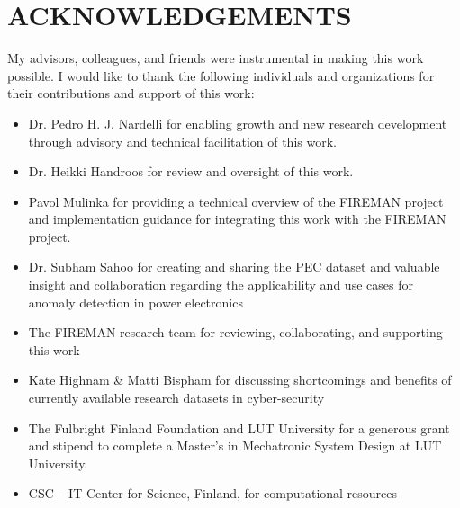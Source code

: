 \section*{\MakeUppercase{Acknowledgements}}
\thispagestyle{empty}
{}%

My advisors, colleagues, and friends were instrumental in making this work possible. I would like to thank the following individuals and organizations for their contributions and support of this work:

\begin{itemize}
    \item Dr. Pedro H. J. Nardelli for enabling growth and new research development through advisory and technical facilitation of this work.
    \item Dr. Heikki Handroos for review and oversight of this work.
    \item Pavol Mulinka for providing a technical overview of the FIREMAN project and implementation guidance for integrating this work with the FIREMAN project.
    \item Dr. Subham Sahoo for creating and sharing the PEC dataset and valuable insight and collaboration regarding the applicability and use cases for anomaly detection in power electronics
    \item The FIREMAN research team for reviewing, collaborating, and supporting this work
    \item Kate Highnam \& Matti Bispham for discussing shortcomings and benefits of currently available research datasets in cyber-security
    \item The Fulbright Finland Foundation and LUT University for a generous grant and stipend to complete a Master's in Mechatronic System Design at LUT University. 
	\item CSC – IT Center for Science, Finland, for computational resources
\end{itemize}
